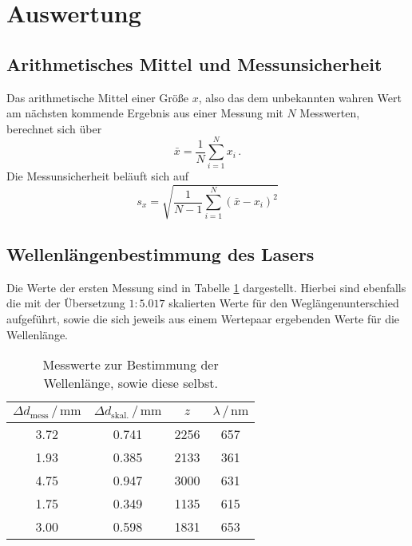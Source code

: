 \section{Auswertung}
\label{sec:Auswertung}

\subsection{Arithmetisches Mittel und Messunsicherheit}

Das arithmetische Mittel einer Größe $x$, also das dem unbekannten wahren Wert am nächsten kommende Ergebnis aus einer Messung mit $N$ Messwerten, berechnet sich über 
\begin{equation}
    \bar{x}=\frac{1}{N} \sum_{i=1}^N x_i\,.
    \label{eqn:mittel}
\end{equation}
Die Messunsicherheit beläuft sich auf 
\begin{equation}
    s_x=\sqrt{\frac{1}{N-1}\sum_{i=1}^N (\bar{x}-x_i)^2}
    \label{eqn:falsch}
\end{equation}

\subsection{Wellenlängenbestimmung des Lasers}

Die Werte der ersten Messung sind in Tabelle \ref{tab:lambda} dargestellt. 
Hierbei sind ebenfalls die mit der Übersetzung $1:5.017$ skalierten Werte für den Weglängenunterschied aufgeführt, 
sowie die sich jeweils aus einem Wertepaar ergebenden Werte für die Wellenlänge. 

\begin{table}
    \centering
    \caption{Messwerte zur Bestimmung der Wellenlänge, sowie diese selbst.}
    \label{tab:lambda}
    \begin{tabular}{c c c c}
        \toprule
        $\Delta d_\text{mess}\,/\,\si{\milli\meter}$ & $\Delta d_\text{skal.}\,/\,\si{\milli\meter}$ & $z$ & $\lambda \,/\,\si{\nano\meter}$ \\
        \midrule
        3.72 & 0.741 & 2256 & 657 \\
        1.93 & 0.385 & 2133 & 361 \\
        4.75 & 0.947 & 3000 & 631 \\
        1.75 & 0.349 & 1135 & 615 \\
        3.00 & 0.598 & 1831 & 653 \\        
        \bottomrule
    \end{tabular}
\end{table}

